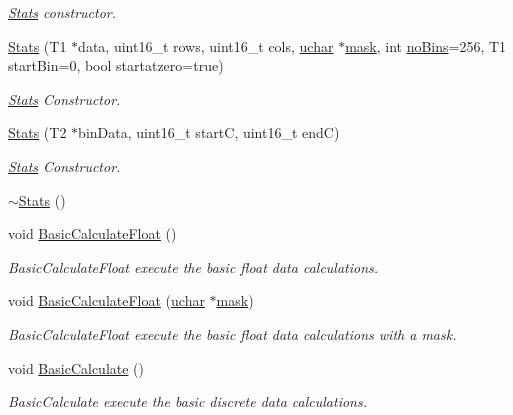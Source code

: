 \begin{DoxyCompactItemize}
\begin{DoxyCompactList}\small\item\em \hyperlink{class_soil_math_1_1_stats}{Stats} constructor. \end{DoxyCompactList}\item 
\hyperlink{class_soil_math_1_1_stats_a8d97e603126f134907f1e4b3b07f7808}{Stats} (T1 $\ast$data, uint16\+\_\+t rows, uint16\+\_\+t cols, \hyperlink{_soil_math_types_8h_a65f85814a8290f9797005d3b28e7e5fc}{uchar} $\ast$\hyperlink{_gen_blob_8m_a2f6787d513f2bdbca6833c1c1ee04329}{mask}, int \hyperlink{class_soil_math_1_1_stats_a4202c9085eacaff2e04eda84fc90e92b}{no\+Bins}=256, T1 start\+Bin=0, bool startatzero=true)
\begin{DoxyCompactList}\small\item\em \hyperlink{class_soil_math_1_1_stats}{Stats} Constructor. \end{DoxyCompactList}\item 
\hyperlink{class_soil_math_1_1_stats_aba14006e6fdc6369a9e723390ed5d75c}{Stats} (T2 $\ast$bin\+Data, uint16\+\_\+t start\+C, uint16\+\_\+t end\+C)
\begin{DoxyCompactList}\small\item\em \hyperlink{class_soil_math_1_1_stats}{Stats} Constructor. \end{DoxyCompactList}\item 
\hyperlink{class_soil_math_1_1_stats_a7cbfe21964aa7ec3e5c7d42d90400746}{$\sim$\+Stats} ()
\item 
void \hyperlink{class_soil_math_1_1_stats_aabe2c0ee2c46c58d915dc7a6eb2d4b84}{Basic\+Calculate\+Float} ()
\begin{DoxyCompactList}\small\item\em Basic\+Calculate\+Float execute the basic float data calculations. \end{DoxyCompactList}\item 
void \hyperlink{class_soil_math_1_1_stats_a980cb5542a1b783f604b4488c1c0b859}{Basic\+Calculate\+Float} (\hyperlink{_soil_math_types_8h_a65f85814a8290f9797005d3b28e7e5fc}{uchar} $\ast$\hyperlink{_gen_blob_8m_a2f6787d513f2bdbca6833c1c1ee04329}{mask})
\begin{DoxyCompactList}\small\item\em Basic\+Calculate\+Float execute the basic float data calculations with a mask. \end{DoxyCompactList}\item 
void \hyperlink{class_soil_math_1_1_stats_ab0c816e596174e53b8e5460b1afce4f9}{Basic\+Calculate} ()
\begin{DoxyCompactList}\small\item\em Basic\+Calculate execute the basic discrete data calculations. \end{DoxyCompactList}\item 

\end{DoxyCompactItemize}
